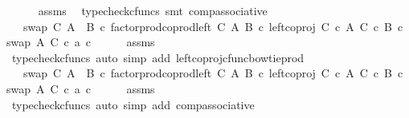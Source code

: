 \begin{isabellebody}
\ \ \ \ \isamarkupfalse%
\ assms\ \isamarkupfalse%
\ {\isacharparenleft}{\kern0pt}typecheck{\isacharunderscore}{\kern0pt}cfuncs{\isacharcomma}{\kern0pt}\ smt\ comp{\isacharunderscore}{\kern0pt}associative{}{\isacharparenright}{\kern0pt}\isanewline
\ \ \isamarkupfalse%
\ \isamarkupfalse%
\ {\isachardoublequoteopen}{\isachardot}{\kern0pt}{\isachardot}{\kern0pt}{\isachardot}{\kern0pt}\ {\isacharequal}{\kern0pt}\ swap\ C\ {\isacharparenleft}{\kern0pt}A\ {\isasymCoprod}\ B{\isacharparenright}{\kern0pt}\ {\isasymcirc}\isactrlsub c\ factor{\isacharunderscore}{\kern0pt}prod{\isacharunderscore}{\kern0pt}coprod{\isacharunderscore}{\kern0pt}left\ C\ A\ B\ {\isasymcirc}\isactrlsub c\ {\isacharparenleft}{\kern0pt}left{\isacharunderscore}{\kern0pt}coproj\ {\isacharparenleft}{\kern0pt}C\ {\isasymtimes}\isactrlsub c\ A{\isacharparenright}{\kern0pt}\ {\isacharparenleft}{\kern0pt}C\ {\isasymtimes}\isactrlsub c\ B{\isacharparenright}{\kern0pt}\ {\isasymcirc}\isactrlsub c\ swap\ A\ C{\isacharparenright}{\kern0pt}\ {\isasymcirc}\isactrlsub c\ {\isasymlangle}a{\isacharcomma}{\kern0pt}\ c{\isasymrangle}{\isachardoublequoteclose}\isanewline
\ \ \ \ \isamarkupfalse%
\ assms\ \isamarkupfalse%
\ {\isacharparenleft}{\kern0pt}typecheck{\isacharunderscore}{\kern0pt}cfuncs{\isacharcomma}{\kern0pt}\ auto\ simp\ add{\isacharcolon}{\kern0pt}\ left{\isacharunderscore}{\kern0pt}coproj{\isacharunderscore}{\kern0pt}cfunc{\isacharunderscore}{\kern0pt}bowtie{\isacharunderscore}{\kern0pt}prod{\isacharparenright}{\kern0pt}\isanewline
\ \ \isamarkupfalse%
\ \isamarkupfalse%
\ {\isachardoublequoteopen}{\isachardot}{\kern0pt}{\isachardot}{\kern0pt}{\isachardot}{\kern0pt}\ {\isacharequal}{\kern0pt}\ swap\ C\ {\isacharparenleft}{\kern0pt}A\ {\isasymCoprod}\ B{\isacharparenright}{\kern0pt}\ {\isasymcirc}\isactrlsub c\ factor{\isacharunderscore}{\kern0pt}prod{\isacharunderscore}{\kern0pt}coprod{\isacharunderscore}{\kern0pt}left\ C\ A\ B\ {\isasymcirc}\isactrlsub c\ left{\isacharunderscore}{\kern0pt}coproj\ {\isacharparenleft}{\kern0pt}C\ {\isasymtimes}\isactrlsub c\ A{\isacharparenright}{\kern0pt}\ {\isacharparenleft}{\kern0pt}C\ {\isasymtimes}\isactrlsub c\ B{\isacharparenright}{\kern0pt}\ {\isasymcirc}\isactrlsub c\ swap\ A\ C\ {\isasymcirc}\isactrlsub c\ {\isasymlangle}a{\isacharcomma}{\kern0pt}\ c{\isasymrangle}{\isachardoublequoteclose}\isanewline
\ \ \ \ \isamarkupfalse%
\ assms\ \isamarkupfalse%
\ {\isacharparenleft}{\kern0pt}typecheck{\isacharunderscore}{\kern0pt}cfuncs{\isacharcomma}{\kern0pt}\ auto\ simp\ add{\isacharcolon}{\kern0pt}\ comp{\isacharunderscore}{\kern0pt}associative{}{\isacharparenright}{\kern0pt}\isanewline

\end{isabellebody}
